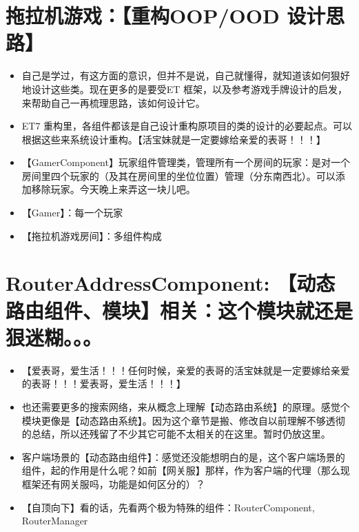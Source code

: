 \documentclass[9pt, b5paper]{article}
\begin{document}
\section{拖拉机游戏：【重构OOP/OOD 设计思路】}
\label{sec-6}
\begin{itemize}
\item 自己是学过，有这方面的意识，但并不是说，自己就懂得，就知道该如何狠好地设计这些类。现在更多的是要受ET 框架，以及参考游戏手牌设计的启发，来帮助自己一再梳理思路，该如何设计它。
\item ET7 重构里，各组件都该是自己设计重构原项目的类的设计的必要起点。可以根据这些来系统设计重构。【活宝妹就是一定要嫁给亲爱的表哥！！！】
\item 【GamerComponent】玩家组件管理类，管理所有一个房间的玩家：是对一个房间里四个玩家的（及其在房间里的坐位位置）管理（分东南西北）。可以添加移除玩家。今天晚上来弄这一块儿吧。
\item 【Gamer】：每一个玩家
\item 【拖拉机游戏房间】：多组件构成
\end{itemize}


\section{RouterAddressComponent: 【动态路由组件、模块】相关：这个模块就还是狠迷糊。。。}
\label{sec-7}
\begin{itemize}
\item 【爱表哥，爱生活！！！任何时候，亲爱的表哥的活宝妹就是一定要嫁给亲爱的表哥！！！爱表哥，爱生活！！！】
\item 也还需要更多的搜索网络，来从概念上理解【动态路由系统】的原理。感觉个模块更像是【动态路由系统】。因为这个章节是搬、修改自以前理解不够透彻的总结，所以还残留了不少其它可能不太相关的在这里。暂时仍放这里。
\item 客户端场景的【动态路由组件】：感觉还没能想明白的是，这个客户端场景的组件，起的作用是什么呢？如前【网关服】那样，作为客户端的代理（那么现框架还有网关服吗，功能是如何区分的）？
\item 【自顶向下】看的话，先看两个极为特殊的组件：RouterComponent, RouterManager
\end{itemize}
\end{document}

